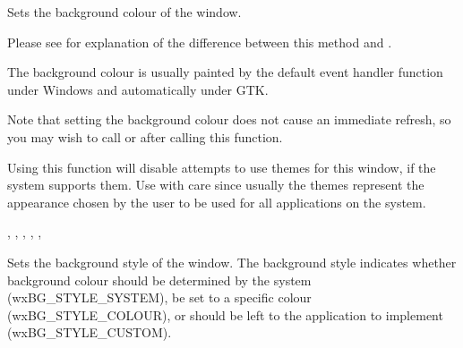\label{wxwindowsetbackgroundcolour}


Sets the background colour of the window.

Please see  for
explanation of the difference between this method and
.




The background colour is usually painted by the default\rtfsp
{} event handler function
under Windows and automatically under GTK.

Note that setting the background colour does not cause an immediate refresh, so you
may wish to call  or  after
calling this function.

Using this function will disable attempts to use themes for this
window, if the system supports them.  Use with care since usually the
themes represent the appearance chosen by the user to be used for all
applications on the system.



,\rtfsp
{},\rtfsp
{},\rtfsp
{},\rtfsp
{},\rtfsp
{}

\label{wxwindowsetbackgroundstyle}


Sets the background style of the window. The background style indicates
whether background colour should be determined by the system (wxBG\_STYLE\_SYSTEM),
be set to a specific colour (wxBG\_STYLE\_COLOUR), or should be left to the
application to implement (wxBG\_STYLE\_CUSTOM).

